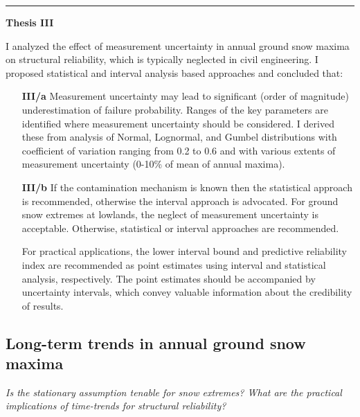 \begin{center}
	\noindent\rule[0.5ex]{0.5\linewidth}{0.5pt}
	\item[\textbf{Thesis III}] \hfill
\end{center}
I analyzed the effect of measurement uncertainty in annual ground snow maxima on structural reliability, which is typically neglected in civil engineering. I proposed statistical and interval analysis based approaches and concluded that:
\begin{enumerate}[leftmargin=*, align=left, labelwidth=*]
	\item[\textbf{III/a}] Measurement uncertainty may lead to significant (order of magnitude) underestimation of failure probability. Ranges of the key parameters are identified where measurement uncertainty should be considered. I derived these from analysis of Normal, Lognormal, and Gumbel distributions with coefficient of variation ranging from 0.2 to 0.6 and with various extents of measurement uncertainty (0-10\% of mean of annual maxima).
	
	\item[\textbf{III/b}] If the contamination mechanism is known then the statistical approach is recommended, otherwise the interval approach is advocated. For ground snow extremes at lowlands, the neglect of measurement uncertainty is acceptable. Otherwise, statistical or interval approaches are recommended.
	
	For practical applications, the lower interval bound and predictive reliability index are recommended as point estimates using interval and statistical analysis, respectively. The point estimates should be accompanied by uncertainty intervals, which convey valuable information about the credibility of results.
\end{enumerate}

  
\citep{RozsasREC2016snow}

\subsection{Long-term trends in annual ground snow maxima}

\textit{Is the stationary assumption tenable for snow extremes? What are the practical implications of time-trends for structural reliability?}

